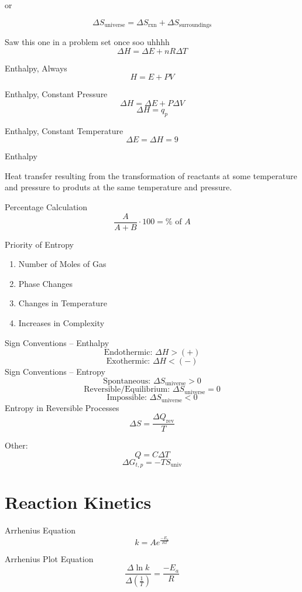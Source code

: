 \documentclass{article}
\begin{document}
\begin{multicols*}{2}
\begin{center}
or

\[
    \Delta S_{\textrm{universe}} = \Delta S_{\textrm{rxn}} + \Delta S_{\textrm{surroundings}}
\]

Saw this one in a problem set once soo uhhhh
\[
    \Delta H = \Delta E + nR \Delta T
\]

Enthalpy, Always
\[
    H = E + PV
\]

Enthalpy, Constant Pressure
\[
    \Delta H = \Delta E + P \Delta V
\]
\[
    \Delta H = q_p
\]

Enthalpy, Constant Temperature
\[
    \Delta E = \Delta H = 9
\]

Enthalpy

\small
Heat transfer resulting from the transformation of reactants at some temperature and pressure to produts at the same temperature and pressure.

\normalsize

Percentage Calculation
\[
    \frac{A}{A + B} \cdot 100 = \% \textrm{ of }A
\]

Priority of Entropy
\begin{enumerate}
    \item Number of Moles of Gas
    \item Phase Changes
    \item Changes in Temperature
    \item Increases in Complexity
\end{enumerate}

\vfill\null\columnbreak

Sign Conventions -- Enthalpy
\[
    \textrm{Endothermic:  }\Delta H > (+) 
\]
\[
    \textrm{Exothermic:  }\Delta H < (-) 
\]
Sign Conventions -- Entropy
\[
    \textrm{Spontaneous: }\Delta S_{\textrm{universe}} > 0
\]
\[
    \textrm{Reversible/Equilibrium:   }\Delta S_{\textrm{universe}} = 0
\]
\[
    \textrm{Impossible: }\Delta S_{\textrm{universe}} < 0
\]
Entropy in Reversible Processes
\[
    \Delta S = \frac{\Delta Q_{\textrm{rev}}}{T}
\]

Other:
\[
    Q = C\Delta T
\]
\[
    \Delta G_{t, p} = -TS_{\textrm{univ}}
\]

\section{Reaction Kinetics}

Arrhenius Equation
\[
    k = Ae^{\frac{-E_a}{RT}}
\]

Arrhenius Plot Equation
\[
    \frac{\Delta\ln{k}}{\Delta\left(\frac{1}{T}\right)} = \frac{-E_a}{R}
\]




    

\end{center}


\end{multicols*}
\end{document}
